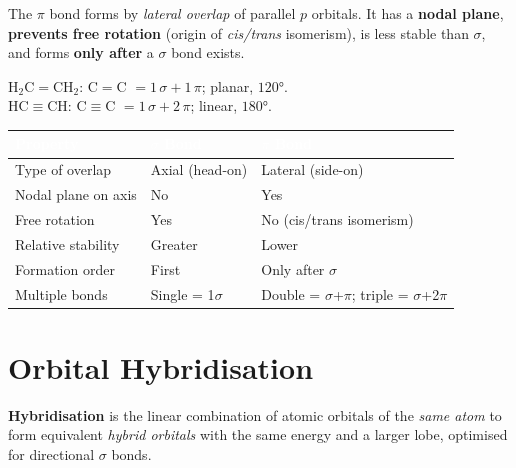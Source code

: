 \documentclass[a4paper,11pt]{article}
\newcommand{\altrow}{\rowcolors{2}{rowcolor}{white}}
\newcommand{\resetrow}{\rowcolors{0}{}{}}
\begin{document}
\begin{definizione}
The $\pi$ bond forms by \textit{lateral overlap} of parallel $p$ orbitals. It has a \textbf{nodal plane}, \textbf{prevents free rotation} (origin of \textit{cis/trans} isomerism), is less stable than $\sigma$, and forms \textbf{only after} a $\sigma$ bond exists.
\end{definizione}

\begin{esempio}
H$_2$C$=$CH$_2$: C$=$C $= 1\,\sigma + 1\,\pi$; planar, $120°$.\\
HC$\equiv$CH: C$\equiv$C $= 1\,\sigma + 2\,\pi$; linear, $180°$.
\end{esempio}

\altrow
\begin{center}
\begin{tabular}{lll}
\toprule
\rowcolor{epflred!85}
\textcolor{white}{\textbf{Property}} & \textcolor{white}{\textbf{$\sigma$ Bond}} & \textcolor{white}{\textbf{$\pi$ Bond}} \\
\midrule
Type of overlap         & Axial (head-on)  & Lateral (side-on) \\
Nodal plane on axis     & No               & Yes \\
Free rotation           & Yes              & No (cis/trans isomerism) \\
Relative stability      & Greater          & Lower \\
Formation order         & First            & Only after $\sigma$ \\
Multiple bonds & Single = 1$\sigma$ & Double = $\sigma$+$\pi$;\; triple = $\sigma$+2$\pi$ \\
\bottomrule
\end{tabular}
\end{center}
\resetrow

\clearpage

\section{Orbital Hybridisation}

\begin{definizione}
\textbf{Hybridisation} is the linear combination of atomic orbitals of the \textit{same atom} to form equivalent \textit{hybrid orbitals} with the same energy and a larger lobe, optimised for directional $\sigma$ bonds.
\end{definizione}
\end{document}
